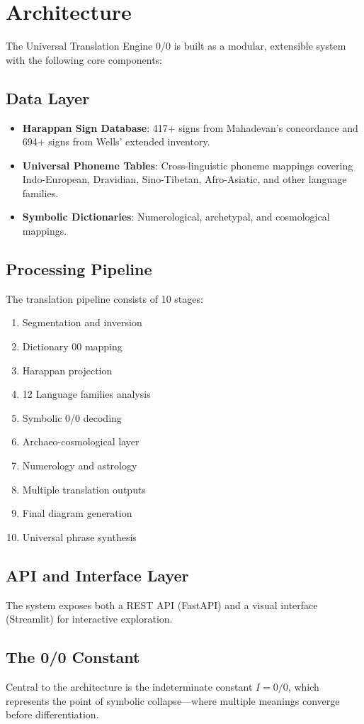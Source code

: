 \section{Architecture}
\label{sec:architecture}

The Universal Translation Engine 0/0 is built as a modular, extensible
system with the following core components:

\subsection{Data Layer}
\begin{itemize}
  \item \textbf{Harappan Sign Database}: 417+ signs from Mahadevan's
        concordance and 694+ signs from Wells' extended inventory.
  \item \textbf{Universal Phoneme Tables}: Cross-linguistic phoneme
        mappings covering Indo-European, Dravidian, Sino-Tibetan,
        Afro-Asiatic, and other language families.
  \item \textbf{Symbolic Dictionaries}: Numerological, archetypal,
        and cosmological mappings.
\end{itemize}

\subsection{Processing Pipeline}
The translation pipeline consists of 10 stages:

\begin{enumerate}
  \item Segmentation and inversion
  \item Dictionary 00 mapping
  \item Harappan projection
  \item 12 Language families analysis
  \item Symbolic 0/0 decoding
  \item Archaeo-cosmological layer
  \item Numerology and astrology
  \item Multiple translation outputs
  \item Final diagram generation
  \item Universal phrase synthesis
\end{enumerate}

\subsection{API and Interface Layer}
The system exposes both a REST API (FastAPI) and a visual interface
(Streamlit) for interactive exploration.

\subsection{The 0/0 Constant}
Central to the architecture is the indeterminate constant $I = 0/0$,
which represents the point of symbolic collapse—where multiple
meanings converge before differentiation.
